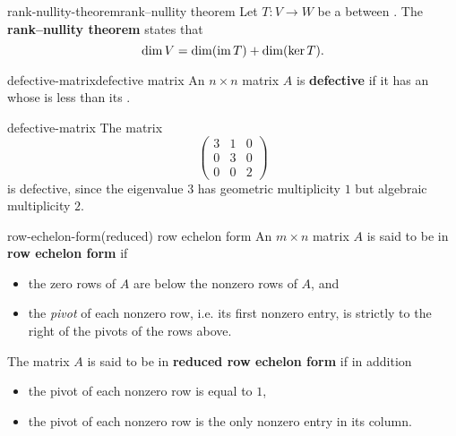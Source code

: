 \begin{topic}{rank-nullity-theorem}{rank--nullity theorem}
    Let $T \colon V \to W$ be a  between . The \textbf{rank--nullity theorem} states that
    \[ \dim V = \dim (\operatorname{im} T) + \dim (\ker T) . \]
\end{topic}

\begin{topic}{defective-matrix}{defective matrix}
    An $n \times n$ matrix $A$ is \textbf{defective} if it has an  whose  is less than its .
\end{topic}

\begin{example}{defective-matrix}
    The matrix
    \[ \begin{pmatrix} 3 & 1 & 0 \\ 0 & 3 & 0 \\ 0 & 0 & 2 \end{pmatrix} \]
    is defective, since the eigenvalue $3$ has geometric multiplicity $1$ but algebraic multiplicity $2$.
\end{example}

\begin{topic}{row-echelon-form}{(reduced) row echelon form}
    An $m \times n$ matrix $A$ is said to be in \textbf{row echelon form} if
    \begin{itemize}
        \item the zero rows of $A$ are below the nonzero rows of $A$, and
        \item the \textit{pivot} of each nonzero row, i.e. its first nonzero entry, is strictly to the right of the pivots of the rows above.
    \end{itemize}
    The matrix $A$ is said to be in \textbf{reduced row echelon form} if in addition
    \begin{itemize}
        \item the pivot of each nonzero row is equal to $1$,
        \item the pivot of each nonzero row is the only nonzero entry in its column.
    \end{itemize}
\end{topic}

